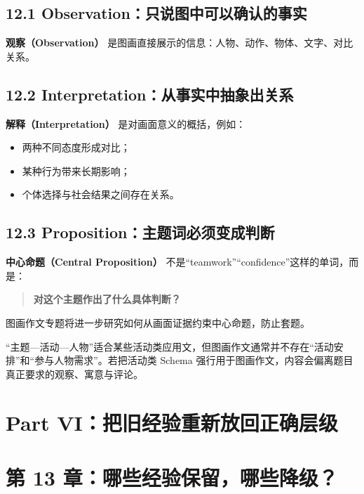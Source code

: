 \documentclass[11pt,a4paper]{ctexart}
\newcommand{\kw}[1]{\textbf{#1}}
\newcommand{\term}[2]{\textbf{#1（#2）}}
\begin{document}
\subsection{12.1 Observation：只说图中可以确认的事实}
\term{观察}{Observation} 是图画直接展示的信息：人物、动作、物体、文字、对比关系。

\subsection{12.2 Interpretation：从事实中抽象出关系}
\term{解释}{Interpretation} 是对画面意义的概括，例如：
\begin{itemize}
  \item 两种不同态度形成对比；
  \item 某种行为带来长期影响；
  \item 个体选择与社会结果之间存在关系。
\end{itemize}

\subsection{12.3 Proposition：主题词必须变成判断}
\term{中心命题}{Central Proposition} 不是“teamwork”“confidence”这样的单词，而是：
\begin{quote}
\kw{对这个主题作出了什么具体判断？}
\end{quote}
图画作文专题将进一步研究如何从画面证据约束中心命题，防止套题。

\begin{warn}
“主题—活动—人物”适合某些活动类应用文，但图画作文通常并不存在“活动安排”和“参与人物需求”。若把活动类 Schema 强行用于图画作文，内容会偏离题目真正要求的观察、寓意与评论。
\end{warn}

\newpage
\section{Part VI：把旧经验重新放回正确层级}

\section{第 13 章：哪些经验保留，哪些降级？}
\end{document}
